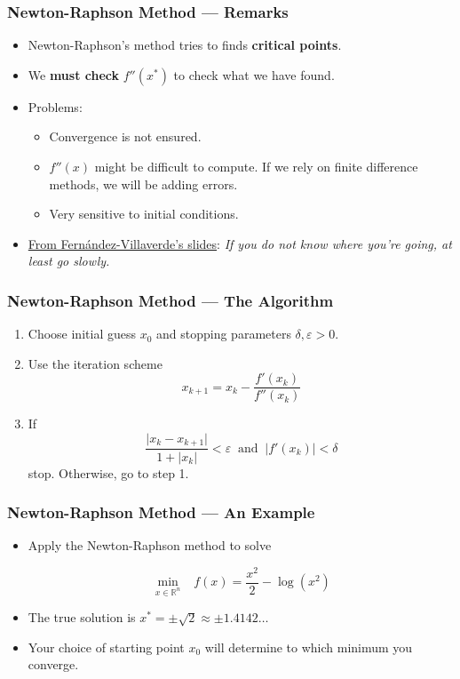 \documentclass[11pt,xcolor={svgnames},aspectratio=169,usepdftitle=false,notheorems]{beamer}
\begin{document}
\begin{frame}
  \frametitle{Newton-Raphson Method --- Remarks}
\begin{itemize}
  \item Newton-Raphson's method tries to finds \alert{\textbf{critical points}}.
  \item We \alert{\textbf{must check}} $f''(x^*)$ to check what we have found.
  \item Problems:
  \begin{itemize}
    \item Convergence is not ensured.
    \item $f''(x)$ might be difficult to compute. If we rely on finite difference methods, we will be adding errors.
    \item Very sensitive to initial conditions.
  \end{itemize}
  \item \href{https://www.sas.upenn.edu/~jesusfv/Lecture_NM_2_Optimization.pdf}{From Fern\'andez-Villaverde's slides}:
  \textit{If you do not know where you're going, at least go slowly.}
\end{itemize}
\end{frame}

\begin{frame}
  \frametitle{Newton-Raphson Method --- The Algorithm}
\begin{enumerate}
  \item Choose initial guess $x_0$ and stopping parameters $\delta,\varepsilon > 0$.
  \item Use the iteration scheme
  \[
  x_{k+1} = x_k - \frac{f'(x_k)}{f''(x_k)}
  \]
  \item If
    \[
    \frac{\lvert x_k - x_{k+1}\rvert}{1 + \lvert x_k \rvert} < \varepsilon \ \text{ and } \ \lvert f'(x_k)\rvert < \delta
    \]
  stop. Otherwise, go to step 1.
\end{enumerate}
\end{frame}

\begin{frame}
  \frametitle{Newton-Raphson Method --- An Example}

\begin{itemize}
  \item Apply the Newton-Raphson method to solve 

  \[
  \underset{x\in\mathbb{R}^n}{\min} \phantom{\Omega} f(x) = \frac{x^2}{2} - \log(x^2)
  \]
  \item The true solution is $x^* = \pm \sqrt{2} \approx \pm 1.4142\ldots$
  \item Your choice of starting point $x_0$ will determine to which minimum you converge.
\end{itemize}
\end{frame}
\end{document}
